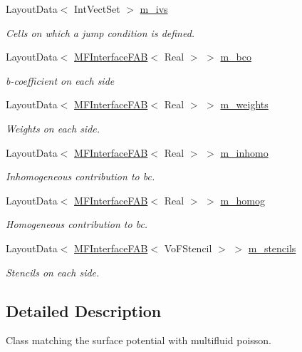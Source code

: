 \begin{DoxyCompactItemize}
Layout\+Data$<$ Int\+Vect\+Set $>$ \hyperlink{classjump__bc_a87161f121c3aed92573d1d668e34bf37}{m\+\_\+ivs}
\begin{DoxyCompactList}\small\item\em Cells on which a jump condition is defined. \end{DoxyCompactList}\item 
Layout\+Data$<$ \hyperlink{classMFInterfaceFAB}{M\+F\+Interface\+F\+AB}$<$ Real $>$ $>$ \hyperlink{classjump__bc_a5fd3215968c01126896c7bc2a4d4288f}{m\+\_\+bco}
\begin{DoxyCompactList}\small\item\em b-\/coefficient on each side \end{DoxyCompactList}\item 
Layout\+Data$<$ \hyperlink{classMFInterfaceFAB}{M\+F\+Interface\+F\+AB}$<$ Real $>$ $>$ \hyperlink{classjump__bc_aace8df163b8d2cc95be45906e2872e61}{m\+\_\+weights}
\begin{DoxyCompactList}\small\item\em Weights on each side. \end{DoxyCompactList}\item 
Layout\+Data$<$ \hyperlink{classMFInterfaceFAB}{M\+F\+Interface\+F\+AB}$<$ Real $>$ $>$ \hyperlink{classjump__bc_af5f5b1aae63ae5c45f68e2a5dab25e65}{m\+\_\+inhomo}
\begin{DoxyCompactList}\small\item\em Inhomogeneous contribution to bc. \end{DoxyCompactList}\item 
Layout\+Data$<$ \hyperlink{classMFInterfaceFAB}{M\+F\+Interface\+F\+AB}$<$ Real $>$ $>$ \hyperlink{classjump__bc_a359058d1b0cf39c13cd2fe79e0ec01d0}{m\+\_\+homog}
\begin{DoxyCompactList}\small\item\em Homogeneous contribution to bc. \end{DoxyCompactList}\item 
Layout\+Data$<$ \hyperlink{classMFInterfaceFAB}{M\+F\+Interface\+F\+AB}$<$ Vo\+F\+Stencil $>$ $>$ \hyperlink{classjump__bc_ad219753bcb966f58bdd9ada2e2227d26}{m\+\_\+stencils}
\begin{DoxyCompactList}\small\item\em Stencils on each side. \end{DoxyCompactList}\end{DoxyCompactItemize}


\subsection{Detailed Description}
Class matching the surface potential with multifluid poisson. 


